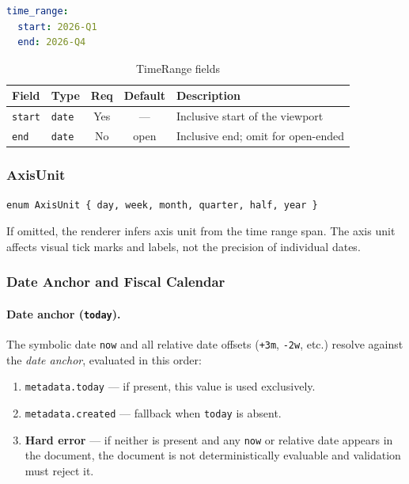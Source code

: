 \begin{lstlisting}[language=yaml]
time_range:
  start: 2026-Q1
  end: 2026-Q4
\end{lstlisting}

\begin{table}[h]
\centering
\begin{tabular}{llccp{5cm}}
\toprule
\textbf{Field} & \textbf{Type} & \textbf{Req} & \textbf{Default} & \textbf{Description} \\
\midrule
\texttt{start} & \texttt{date} & Yes & --- & Inclusive start of the viewport \\
\texttt{end} & \texttt{date} & No & open & Inclusive end; omit for open-ended \\
\bottomrule
\end{tabular}
\caption{TimeRange fields}
\label{tab:timerange-fields}
\end{table}

\subsubsection{AxisUnit}

\begin{lstlisting}
enum AxisUnit { day, week, month, quarter, half, year }
\end{lstlisting}

If omitted, the renderer infers axis unit from the time range span. The axis unit affects
visual tick marks and labels, not the precision of individual dates.

\subsubsection{Date Anchor and Fiscal Calendar}
\label{sec:date-anchor}

\paragraph{Date anchor (\texttt{today}).}
The symbolic date \texttt{now} and all relative date offsets (\texttt{+3m}, \texttt{-2w},
etc.) resolve against the \emph{date anchor}, evaluated in this order:
\begin{enumerate}
  \item \texttt{metadata.today} — if present, this value is used exclusively.
  \item \texttt{metadata.created} — fallback when \texttt{today} is absent.
  \item \textbf{Hard error} — if neither is present and any \texttt{now} or relative date
        appears in the document, the document is not deterministically evaluable and
        validation must reject it.
\end{enumerate}

